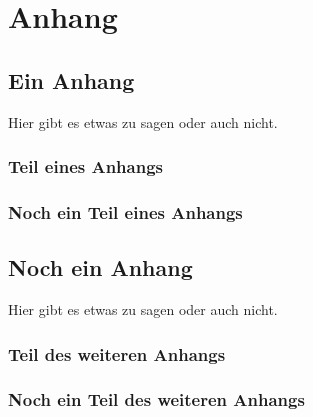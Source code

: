 \appendix
\chapter{Anhang}
\section{Ein Anhang}
	Hier gibt es etwas zu sagen oder auch nicht.
	\subsection{Teil eines Anhangs}
	\blindtext
	\subsection{Noch ein Teil eines Anhangs}
	\blinditemize
\section{Noch ein Anhang}
	Hier gibt es etwas zu sagen oder auch nicht.
	\subsection{Teil des weiteren Anhangs}
	\blindenumerate
	\subsection{Noch ein Teil des weiteren Anhangs}
	\blindmathpaper